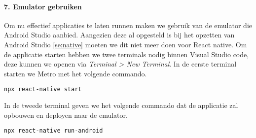\paragraph{7. Emulator gebruiken} \label{par:emulatorgebruiken}
Om nu effectief applicaties te laten runnen maken we gebruik van de emulator die Android Studio aanbied. 
Aangezien deze al opgesteld is bij het opzetten van Android Studio \ref{se:native} 
moeten we dit niet meer doen voor React native. Om de applicatie starten hebben we twee terminals nodig 
binnen Visual Studio code, deze kunnen we openen via \textit{Terminal > New Terminal}. 
In de eerste terminal starten we \Gls{Metro} met het volgende commando.
\begin{verbatim}
npx react-native start
\end{verbatim}
In de tweede terminal geven we het volgende commando dat de applicatie zal opbouwen en 
deployen naar de emulator.
\begin{verbatim}
npx react-native run-android
\end{verbatim}